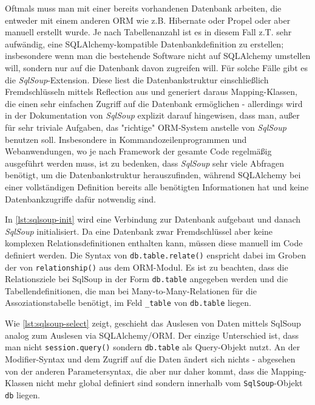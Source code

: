 Oftmals muss man mit einer bereits vorhandenen Datenbank arbeiten, die entweder
mit einem anderen ORM wie z.B. Hibernate oder Propel oder aber manuell erstellt
wurde. Je nach Tabellenanzahl ist es in diesem Fall z.T. sehr aufwändig, eine
SQLAlchemy-kompatible Datenbankdefinition zu erstellen; insbesondere wenn man
die bestehende Software nicht auf SQLAlchemy umstellen will, sondern nur auf die
Datenbank davon zugreifen will. Für solche Fälle gibt es die
\emph{SqlSoup}-Extension. Diese liest die Datenbankstruktur einschließlich
Fremdschlüsseln mittels Reflection aus und generiert daraus Mapping-Klassen, die
einen sehr einfachen Zugriff auf die Datenbank ermöglichen - allerdings wird in
der Dokumentation von \emph{SqlSoup} explizit darauf hingewisen, dass man, außer
für sehr triviale Aufgaben, das "richtige" ORM-System anstelle von \emph{SqlSoup}
benutzen soll. Insbesondere in Kommandozeilenprogrammen und Webanwendungen, wo
je nach Framework der gesamte Code regelmäßig ausgeführt werden muss, ist zu
bedenken, dass \emph{SqlSoup} sehr viele Abfragen benötigt, um die
Datenbankstruktur herauszufinden, während SQLAlchemy bei einer vollständigen
Definition bereits alle benötigten Informationen hat und keine Datenbankzugriffe
dafür notwendig sind.

In \autoref{lst:sqlsoup-init} wird eine Verbindung zur Datenbank aufgebaut und
danach \emph{SqlSoup} initialisiert. Da eine Datenbank zwar Fremdschlüssel aber
keine komplexen Relationsdefinitionen enthalten kann, müssen diese manuell im
Code definiert werden. Die Syntax von \texttt{db.table.relate()} enspricht dabei
im Groben der von \texttt{relationship()} aus dem ORM-Modul. Es ist zu beachten,
dass die Relationsziele bei SqlSoup in der Form \texttt{db.table} angegeben
werden und die Tabellendefinitionen, die man bei Many-to-Many-Relationen für die
Assoziationstabelle benötigt, im Feld \texttt{\_table} von \texttt{db.table}
liegen.



Wie \autoref{lst:sqlsoup-select} zeigt, geschieht das Auslesen von Daten mittels
SqlSoup analog zum Auslesen via SQLAlchemy/ORM. Der einzige
Unterschied ist, dass man nicht \texttt{session.query()} sondern
\texttt{db.table} als Query-Objekt nutzt. An der Modifier-Syntax und dem Zugriff
auf die Daten ändert sich nichts - abgesehen von der anderen Parametersyntax, die
aber nur daher kommt, dass die Mapping-Klassen nicht mehr global definiert sind
sondern innerhalb vom \texttt{SqlSoup}-Objekt \texttt{db} liegen.

